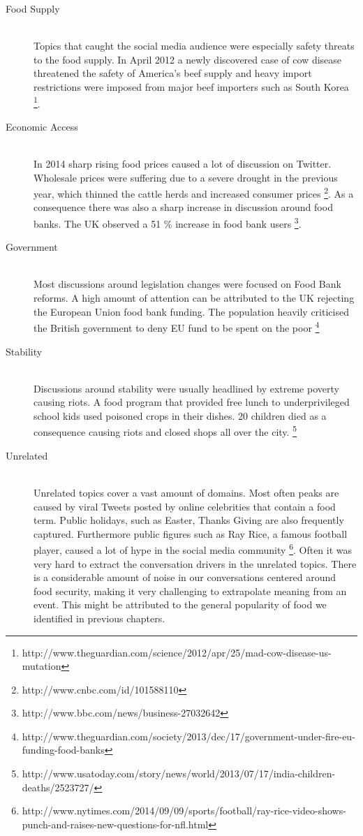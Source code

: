 \begin{description}
  \item[Food Supply ] \hfill \\
 Topics that caught the social media audience were especially safety threats to the food supply. In April 2012 a newly discovered case of cow disease threatened the safety of America's beef supply and heavy import restrictions were imposed from major beef importers such as South Korea \footnote{http://www.theguardian.com/science/2012/apr/25/mad-cow-disease-us-mutation}.
  \item[Economic Access] \hfill \\
  In 2014 sharp rising food prices caused a lot of discussion on Twitter. Wholesale prices were suffering due to a severe drought in the previous year, which thinned the cattle herds and increased consumer prices \footnote{http://www.cnbc.com/id/101588110}. As a consequence there was also a sharp increase in discussion around food banks. The UK observed a 51 \% increase in food bank users \footnote{http://www.bbc.com/news/business-27032642}. 
  \item[Government] \hfill \\
  Most discussions around legislation changes were focused on Food Bank reforms. A high amount of attention can be attributed to the UK rejecting the European Union food bank funding. The population heavily criticised the British government to deny EU fund to be spent on the poor \footnote{http://www.theguardian.com/society/2013/dec/17/government-under-fire-eu-funding-food-banks}
    \item[Stability] \hfill \\
  Discussions around stability were usually headlined by extreme poverty causing riots. A food program that provided free lunch to underprivileged school kids used poisoned crops in their dishes. 20 children died as a consequence causing riots and closed shops all over the city. \footnote{http://www.usatoday.com/story/news/world/2013/07/17/india-children-deaths/2523727/}
   \item[Unrelated] \hfill \\
   Unrelated topics cover a vast amount of domains. Most often peaks are caused by viral Tweets posted by online celebrities that contain a food term. Public holidays, such as Easter, Thanks Giving are also frequently captured. Furthermore public figures such as Ray Rice, a famous football player, caused a lot of hype in the social media community \footnote{http://www.nytimes.com/2014/09/09/sports/football/ray-rice-video-shows-punch-and-raises-new-questions-for-nfl.html}. Often it was very hard to extract the conversation drivers in the unrelated topics. There is a considerable amount of noise in our conversations centered around food security, making it very challenging to extrapolate meaning from an event. This might be attributed to the general popularity of food we identified in previous chapters. 

\end{description}




